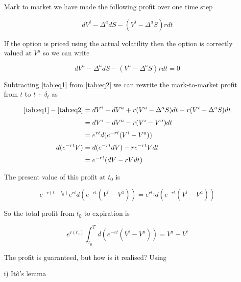 \documentclass{article}
\newcommand{\para}{\vspace{8pt}} %
\begin{document}
Mark to market we have made the following profit over one time step

\begin{center}
\begin{equation}
    dV^i - \Delta^a dS -(V^i - \Delta^a S) rdt
    \label{tab:eq1}
\end{equation}
\end{center}
If the option is priced using the actual volatility then the option is correctly valued at $V^a$ so we can write
\begin{center}
\begin{equation}
    dV^a - \Delta^a dS -(V^a - \Delta^a S) rdt = 0 
    \label{tab:eq2}
\end{equation}
\end{center}
Subtracting \ref{tab:eq1} from \ref{tab:eq2} we can rewrite the mark-to-market profit from $t$ to $t + \delta_t$ as

\begin{center}
\begin{align*}
    \ref{tab:eq1} - \ref{tab:eq2} & = dV^i - dV^a + r(V^a - \Delta^a S) dt - r (V^i - \Delta^a S) dt \\[2pt]
                                  & = dV^i - dV^a - r(V^i - V^a) dt \\[2pt]
                                  & = e^{rt} d(e^{-rt} (V^i - V^a)) \\[2pt]
    d(e^{-rt}V)                   & = d(e^{-rt} dV) -r e^{-rt} V dt \\[2pt]
                                  & = e^{-rt} (dV -rV dt) \\
\end{align*}
\end{center}


The present value of this profit at $t_0$ is

\[
    e^{-r(t-t_0)} e^{rt} d(e^{-rt} (V^i - V^a)) = e^{rt_0} d(e^{-rt} (V^i - V^a))
\]

So the total profit from $t_0$ to expiration is

\begin{center}
\begin{equation}
    e^{r(t_0)} \int_{t_0}^{T} d(e^{-rt} (V^i - V^a)) = V^a - V^i
\end{equation}
\end{center}


The profit is guaranteed, but how is it realised? Using
\para

i) It\^{o}'s lemma 
\end{document}
